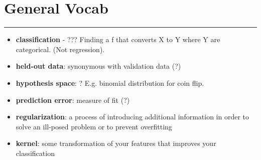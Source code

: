 \section{General Vocab}
\smallskip \hrule height 2pt \smallskip
 
 \begin{itemize}
 	\item \textbf{classification} - ??? Finding a f that converts X to Y where Y are categorical.  (Not regression).  
 	\item \textbf{held-out data}: synonymous with validation data (?)
	\item \textbf{hypothesis space}: ?  E.g. binomial distribution for coin flip.  	
 	\item \textbf{prediction error}: measure of fit (?) 
	\item \textbf{regularization}: a process of introducing additional information in order to solve an ill-posed problem or to prevent overfitting  %
	\item \textbf{kernel}: some transformation of your features that improves your classification %
 \end{itemize}